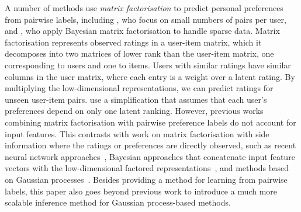 A number of methods use \emph{matrix factorisation} to predict personal preferences 
from pairwise labels, including 
\citet{yi_inferring_2013}, who focus on small numbers of pairs per user,
and \citet{salimans2012collaborative}, who apply Bayesian matrix factorisation to 
handle sparse data.
Matrix factorisation represents observed ratings in a user-item matrix,
which it decomposes into two matrices of lower rank than the user-item matrix, 
one corresponding to users and one to items.
Users with similar ratings have similar columns in the user
matrix, where each entry is a weight over a latent rating.
By multiplying the low-dimensional representations, we can predict ratings for unseen
user-item pairs. 
\citet{kim2014latent} use a simplification that assumes that
each user's preferences depend on only one latent ranking.
However, previous works combining matrix factorisation with
pairwise preference labels do not account for input features.
This contrasts with work on matrix factorisation with side information
where the ratings or preferences are directly observed,
such as recent neural network approaches~\citep{NIPS2017_7081},
Bayesian approaches that concatenate input feature vectors with the low-dimensional factored representations~\citep{porteous2010bayesian},
and methods based on Gaussian processes~\citep{adams2010incorporating}. 
Besides providing a method for learning from pairwise labels, this paper
also goes beyond previous work to introduce a much more scalable inference method for Gaussian
process-based methods.



